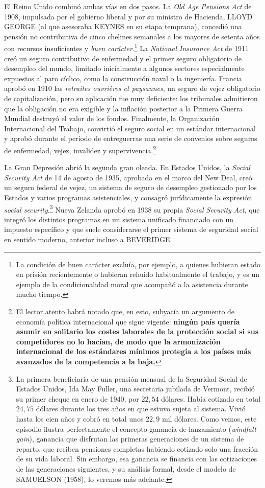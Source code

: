 \documentclass[10pt,a4paper]{article}
\begin{document}
El Reino Unido combinó ambas vías en dos pasos. La \textit{Old Age Pensions Act} de 1908, impulsada por el gobierno liberal y por su ministro de Hacienda, LLOYD GEORGE (al que asesoraba KEYNES en su etapa temprana), concedió una pensión no contributiva de cinco chelines semanales a los mayores de setenta años con recursos insuficientes y \textit{buen carácter}.\footnote{%
    La condición de buen carácter excluía, por ejemplo, a quienes hubieran estado en prisión recientemente o hubieran rehuido habitualmente el trabajo, y es un ejemplo de la condicionalidad moral que acompañó a la asistencia durante mucho tiempo.
} La \textit{National Insurance Act} de 1911 creó un seguro contributivo de enfermedad y el primer seguro obligatorio de desempleo del mundo, limitado inicialmente a algunos sectores especialmente expuestos al paro cíclico, como la construcción naval o la ingeniería. Francia aprobó en 1910 las \textit{retraites ouvrières et paysannes}, un seguro de vejez obligatorio de capitalización, pero su aplicación fue muy deficiente: los tribunales admitieron que la obligación no era exigible y la inflación posterior a la Primera Guerra Mundial destruyó el valor de los fondos. Finalmente, la Organización Internacional del Trabajo, convirtió el seguro social en un estándar internacional y aprobó durante el período de entreguerras una serie de convenios sobre seguros de enfermedad, vejez, invalidez y supervivencia.\footnote{%
    El lector atento habrá notado que, en esto, subyacía un argumento de economía política internacional que sigue vigente: \textbf{ningún país quería asumir en solitario los costes laborales de la protección social si sus competidores no lo hacían, de modo que la armonización internacional de los estándares mínimos protegía a los países más avanzados de la competencia a la baja.}
}

La Gran Depresión abrió la segunda gran oleada. En Estados Unidos, la \textit{Social Security Act} de 14 de agosto de 1935, aprobada en el marco del New Deal, creó un seguro federal de vejez, un sistema de seguro de desempleo gestionado por los Estados y varios programas asistenciales, y consagró jurídicamente la expresión \textit{social security}.\footnote{%
    La primera beneficiaria de una pensión mensual de la Seguridad Social de Estados Unidos, Ida May Fuller, una secretaria jubilada de Vermont, recibió su primer cheque en enero de 1940, por $22,54$ dólares. Había cotizado en total $24,75$ dólares durante los tres años en que estuvo sujeta al sistema. Vivió hasta los cien años y cobró en total unos $22,9$ mil dólares. Como vemos, este episodio ilustra perfectamente el concepto ganancia de lanzamiento (\textit{windfall gain}), ganancia que disfrutan las primeras generaciones de un sistema de reparto, que reciben pensiones completas habiendo cotizado solo una fracción de su vida laboral. Sin embargo, esa ganancia se financia con las cotizaciones de las generaciones siguientes, y su análisis formal, desde el modelo de SAMUELSON (1958), lo veremos más adelante.
} Nueva Zelanda aprobó en 1938 su propia \textit{Social Security Act}, que integró los distintos programas en un sistema unificado financiado con un impuesto específico y que suele considerarse el primer sistema de seguridad social en sentido moderno, anterior incluso a BEVERIDGE.
\end{document}
